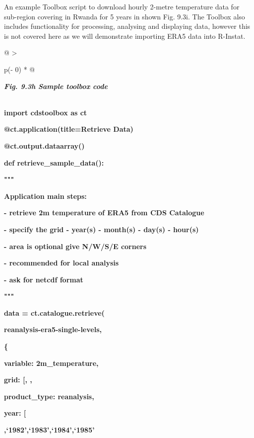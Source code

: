\documentclass[
  letterpaper,
  DIV=11,
  numbers=noendperiod]{scrreprt}
\begin{document}
An example Toolbox script to download hourly 2-metre temperature data
for sub-region covering in Rwanda for 5 years in shown Fig. 9.3i. The
Toolbox also includes functionality for processing, analysing and
displaying data, however this is not covered here as we will demonstrate
importing ERA5 data into R-Instat.

\begin{longtable}[]{@{}
  >{\raggedright\arraybackslash}p{(\columnwidth - 0\tabcolsep) * }@{}}
\toprule\noalign{}
\begin{minipage}[b]{\linewidth}\raggedright
\textbf{\emph{Fig. 9.3h Sample toolbox code}}
\end{minipage} \\
\midrule\noalign{}
\endhead
\bottomrule\noalign{}
\endlastfoot
\textbf{import cdstoolbox as ct}

\textbf{@ct.application(title=\textquotesingle Retrieve
Data\textquotesingle)}

\textbf{@ct.output.dataarray()}

\textbf{def retrieve\_sample\_data():}

\textbf{"""}

\textbf{Application main steps:}

\textbf{- retrieve 2m temperature of ERA5 from CDS Catalogue}

\textbf{- specify the grid - year(s) - month(s) - day(s) - hour(s)}

\textbf{- area is optional give N/W/S/E corners}

\textbf{- recommended for local analysis}

\textbf{- ask for netcdf format}

\textbf{"""}

\textbf{data = ct.catalogue.retrieve(}

\textbf{\textquotesingle reanalysis-era5-single-levels\textquotesingle,}

\textbf{\{}

\textbf{\textquotesingle variable\textquotesingle:
\textquotesingle2m\_temperature\textquotesingle,}

\textbf{\textquotesingle grid\textquotesingle:
{[}\textquotesingle,
\textquotesingle{]},}

\textbf{\textquotesingle product\_type\textquotesingle:
\textquotesingle reanalysis\textquotesingle,}

\textbf{\textquotesingle year\textquotesingle: {[}}

\textbf{\textquotesingle,`1982',`1983',`1984',`1985'}


\end{longtable}
\end{document}
